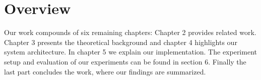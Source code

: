 
\section{Overview}

Our work compounds of six remaining chapters:
Chapter 2 provides related work. Chapter 3 presents the theoretical background and chapter 4 highlights our system architecture. In chapter 5 we explain our implementation. The experiment setup and evaluation of our experiments can be found in section 6. Finally the last part concludes the work, where our findings are summarized.